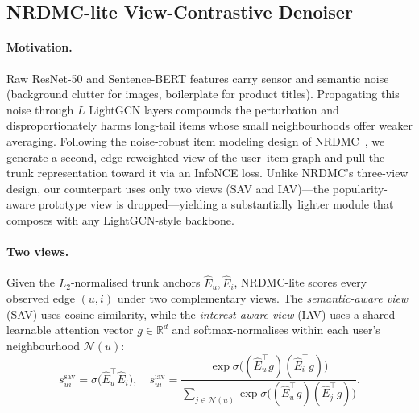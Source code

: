 \documentclass[conference]{IEEEtran}
\begin{document}
\subsection{NRDMC-lite View-Contrastive Denoiser}
\label{sec:nrdmc}

\paragraph{Motivation.} Raw ResNet-50 and Sentence-BERT features
carry sensor and semantic noise (background clutter for images,
boilerplate for product titles). Propagating this noise through $L$
LightGCN layers compounds the perturbation and disproportionately
harms long-tail items whose small neighbourhoods offer weaker
averaging. Following the noise-robust item modeling design of
NRDMC~\cite{gong2026noise}, we generate a second, edge-reweighted
view of the user--item graph and pull the trunk representation
toward it via an InfoNCE loss. Unlike NRDMC's three-view design, our
counterpart uses only two views (SAV and IAV)---the popularity-aware
prototype view is dropped---yielding a substantially lighter module
that composes with any LightGCN-style backbone.

\paragraph{Two views.} Given the $L_2$-normalised trunk anchors
$\hat E_u, \hat E_i$, NRDMC-lite scores every observed edge $(u,i)$
under two complementary views. The \emph{semantic-aware view} (SAV)
uses cosine similarity, while the \emph{interest-aware view} (IAV)
uses a shared learnable attention vector $g\in\mathbb{R}^{d}$ and
softmax-normalises within each user's neighbourhood $\mathcal{N}(u)$:
\begin{equation}
s^{\text{sav}}_{ui} = \sigma\!\big(\hat E_u^{\top}\hat E_i\big),\quad
s^{\text{iav}}_{ui} =
\frac{\exp\!\sigma\!\big((\hat E_u^{\top}g)(\hat E_i^{\top}g)\big)}
     {\sum_{j\in\mathcal{N}(u)}
       \exp\!\sigma\!\big((\hat E_u^{\top}g)(\hat E_j^{\top}g)\big)}.
\label{eq:saviav}
\end{equation}
\end{document}
